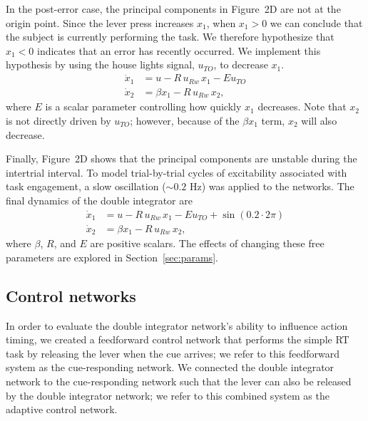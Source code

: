 \documentclass[11pt]{article}
\begin{document}
In the post-error case,
the principal components
in Figure~2D are
not at the origin point.
Since the lever press increases $x_1$,
when $x_1 > 0$ we can conclude that
the subject is currently performing the task.
We therefore hypothesize that $x_1 < 0$
indicates that an error has recently occurred.
We implement this hypothesis
by using the house lights signal,
$u_{TO}$, to decrease $x_1$.
\begin{equation} \label{eq:dint}
  \begin{aligned}
    \dot{x}_1 &= u - R \, u_{Rw} \, x_1 - E u_{TO} \\
    \dot{x}_2 &= \beta x_1 - R \, u_{Rw} \, x_2,
  \end{aligned}
\end{equation}
where $E$ is a scalar parameter
controlling how quickly $x_1$ decreases.
Note that $x_2$ is not directly driven by $u_{TO}$;
however, because of the $\beta x_1$ term,
$x_2$ will also decrease.

Finally, Figure~2D shows that
the principal components are unstable
during the intertrial interval.
To model trial-by-trial cycles of
excitability associated with task engagement,
a slow oscillation ($\sim0.2$ Hz)
was applied to the networks.
The final dynamics of the double integrator are
\begin{equation} \label{eq:dint-o}
  \begin{aligned}
    \dot{x}_1 &= u - R \, u_{Rw} \, x_1 - E u_{TO} + \sin(0.2 \cdot 2 \pi) \\
    \dot{x}_2 &= \beta x_1 - R \, u_{Rw} \, x_2,
  \end{aligned}
\end{equation}
where $\beta$, $R$, and $E$ are positive scalars.
The effects of changing these free parameters
are explored in Section~\ref{sec:params}.

\subsection{Control networks} \label{sec:control}

In order to evaluate the double integrator network's
ability to influence action timing,
we created a feedforward control network
that performs the simple RT task
by releasing the lever
when the cue arrives;
we refer to this feedforward system as the cue-responding network.
We connected the double integrator network
to the cue-responding network such that
the lever can also be released
by the double integrator network;
we refer to this combined system as the adaptive control network.
\end{document}
